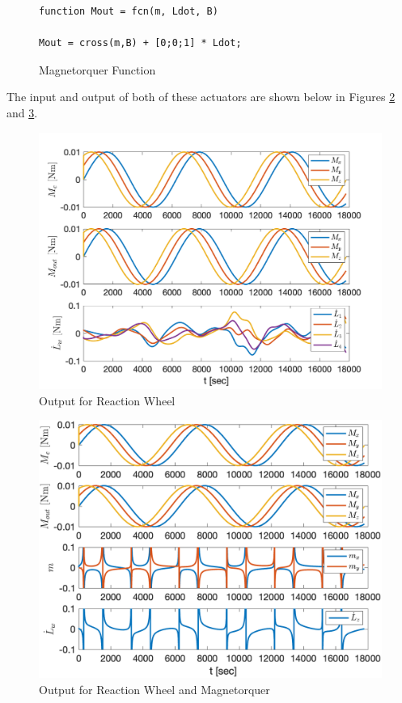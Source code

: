 \begin{figure}[H]
    \centering
    \captionsetup{ justification = centering}
    \begin{lstlisting}
function Mout = fcn(m, Ldot, B)

Mout = cross(m,B) + [0;0;1] * Ldot;
    \end{lstlisting}
    \caption{Magnetorquer Function}
    \label{fig:mtCode}
\end{figure}

The input and output of both of these actuators are shown below in Figures \ref{fig:rwOutput} and \ref{fig:mtOutput}.

\begin{figure}[H]
    \centering
    \captionsetup{ justification = centering }
    \includegraphics[width = 15cm]{Images/PS9/reaction_wheel_model_output.png}
    \caption{Output for Reaction Wheel}
    \label{fig:rwOutput}
\end{figure}

\begin{figure}[H]
    \centering
    \captionsetup{ justification = centering }
    \includegraphics[width = 15cm]{Images/PS9/simple_magnetorquer_plus_wheel_model_output.png}
    \caption{Output for Reaction Wheel and Magnetorquer}
    \label{fig:mtOutput}
\end{figure}

